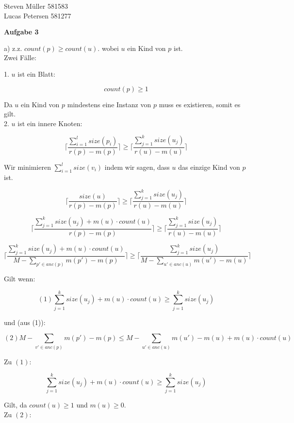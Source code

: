 \documentclass[a4paper,12pt]{scrartcl}
\begin{document}
\begin{flushleft}
Steven Müller 581583 \\
Lucas Petersen 581277 
\end{flushleft}
\begin{large}
	\textbf{Aufgabe 3}\\
\end{large}

a) z.z. $count(p) \geq count(u).$ wobei $u$ ein Kind von $p$ ist.\\


Zwei Fälle:

1. $u$ ist ein Blatt:

$$ count(p)\geq 1$$

Da $u$ ein Kind von $p$ mindestens eine Instanz von $p$ muss es existieren, somit es gilt.\\


2. $u$ ist ein innere Knoten:

$$ \lceil {\frac{\sum_{i=1}^{l} size(p_i)}{r(p) - m(p)}}\rceil\geq \lceil {\frac{\sum_{j=1}^{k} size(u_j)}{r(u) - m(u)}}\rceil$$

Wir minimieren $\sum_{i=1}^{l} size(v_i)$ indem wir sagen, dass $u$ das einzige Kind von $p$ ist.

$$ \lceil {\frac{size(u)}{r(p) - m(p)}}\rceil\geq \lceil {\frac{\sum_{j=1}^{k} size(u_j)}{r(u) - m(u)}}\rceil$$

$$ \lceil {\frac{\sum_{j=1}^{k} size(u_j) + m(u)\cdot count(u)}{r(p) - m(p)}}\rceil\geq \lceil {\frac{\sum_{j=1}^{k} size(u_j)}{r(u) - m(u)}}\rceil$$

$$ \lceil {\frac{\sum_{j=1}^{k} size(u_j) + m(u)\cdot count(u)}{M - \sum_{p' \in anc(p)}m(p') - m(p)}}\rceil\geq \lceil {\frac{\sum_{j=1}^{k} size(u_j)}{M - \sum_{u' \in anc(u)}m(u') - m(u)}}\rceil$$

Gilt wenn:

$$(1) \sum_{j=1}^{k} size(u_j) + m(u)\cdot count(u)\geq \sum_{j=1}^{k} size(u_j)$$

und (aus (1)):

$$(2) M - \sum_{v' \in anc(p)}m(p') - m(p)\leq M - \sum_{u' \in anc(u)}m(u') - m(u)  + m(u)\cdot count(u)$$

Zu $(1)$:

$$\sum_{j=1}^{k} size(u_j) + m(u)\cdot count(u)\geq \sum_{j=1}^{k} size(u_j)$$

Gilt, da $count(u) \geq 1$ und $m(u) \geq 0$.\\

Zu $(2)$:
\end{document}

